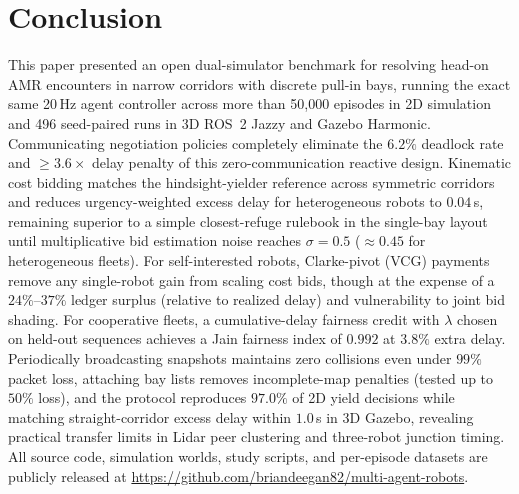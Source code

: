 \section{Conclusion}\label{sec:conc}
This paper presented an open dual-simulator benchmark for resolving head-on AMR encounters in narrow corridors with discrete pull-in bays, running the exact same 20\,Hz agent controller across more than 50,000 episodes in 2D simulation and 496 seed-paired runs in 3D ROS~2 Jazzy and Gazebo Harmonic. Communicating negotiation policies completely eliminate the $6.2\%$ deadlock rate and $\ge 3.6\times$ delay penalty of this zero-communication reactive design. Kinematic cost bidding matches the hindsight-yielder reference across symmetric corridors and reduces urgency-weighted excess delay for heterogeneous robots to $0.04$\,s, remaining superior to a simple closest-refuge rulebook in the single-bay layout until multiplicative bid estimation noise reaches $\sigma=0.5$ ($\approx0.45$ for heterogeneous fleets). For self-interested robots, Clarke-pivot (VCG) payments remove any single-robot gain from scaling cost bids, though at the expense of a $24\%$--$37\%$ ledger surplus (relative to realized delay) and vulnerability to joint bid shading. For cooperative fleets, a cumulative-delay fairness credit with $\lambda$ chosen on held-out sequences achieves a Jain fairness index of $0.992$ at $3.8\%$ extra delay. Periodically broadcasting snapshots maintains zero collisions even under $99\%$ packet loss, attaching bay lists removes incomplete-map penalties (tested up to $50\%$ loss), and the protocol reproduces $97.0\%$ of 2D yield decisions while matching straight-corridor excess delay within $1.0$\,s in 3D Gazebo, revealing practical transfer limits in Lidar peer clustering and three-robot junction timing. All source code, simulation worlds, study scripts, and per-episode datasets are publicly released at \url{https://github.com/briandeegan82/multi-agent-robots}.